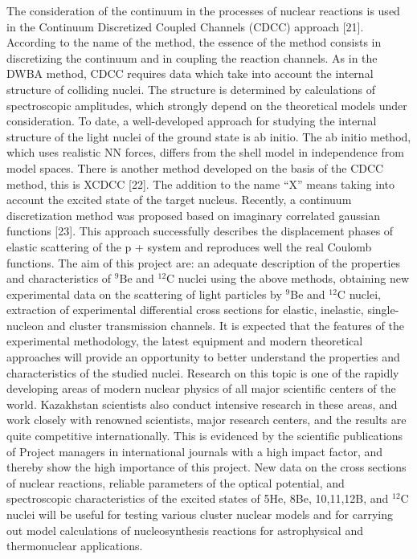 \documentclass[
12pt, %
oneside, %
english, %
onehalfspacing, %
headsepline, %
]{MastersDoctoralThesis} %
\begin{document}
The consideration of the continuum in the processes of nuclear reactions is used in the Continuum Discretized Coupled Channels (CDCC) approach [21]. According to the name of the method, the essence of the method consists in discretizing the continuum and in coupling the reaction channels. As in the DWBA method, CDCC requires data which take into account the internal structure of colliding nuclei. The structure is determined by calculations of spectroscopic amplitudes, which strongly depend on the theoretical models under consideration. To date, a well-developed approach for studying the internal structure of the light nuclei of the ground state is ab initio. The ab initio method, which uses realistic NN forces, differs from the shell model in independence from model spaces. There is another method developed on the basis of the CDCC method, this is XCDCC [22]. The addition to the name “X” means taking into account the excited state of the target nucleus. Recently, a continuum discretization method was proposed based on imaginary correlated gaussian functions [23]. This approach successfully describes the displacement phases of elastic scattering of the p +  system and reproduces well the real Coulomb functions.
The aim of this project are: an adequate description of the properties and characteristics of $^{9}$Be and $^{12}$C nuclei using the above methods, obtaining new experimental data on the scattering of light particles by $^{9}$Be and $^{12}$C nuclei, extraction of experimental differential cross sections for elastic, inelastic, single-nucleon and cluster transmission channels. It is expected that the features of the experimental methodology, the latest equipment and modern theoretical approaches will provide an opportunity to better understand the properties and characteristics of the studied nuclei.
Research on this topic is one of the rapidly developing areas of modern nuclear physics of all major scientific centers of the world. Kazakhstan scientists also conduct intensive research in these areas, and work closely with renowned scientists, major research centers, and the results are quite competitive internationally. This is evidenced by the scientific publications of Project managers in international journals with a high impact factor, and thereby show the high importance of this project. New data on the cross sections of nuclear reactions, reliable parameters of the optical potential, and spectroscopic characteristics of the excited states of 5He, 8Be, 10,11,12B, and $^{12}$C nuclei will be useful for testing various cluster nuclear models and for carrying out model calculations of nucleosynthesis reactions for astrophysical and thermonuclear applications.
\end{document}
